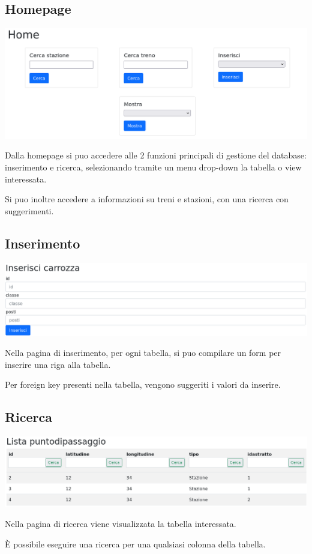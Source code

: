 \documentclass[a4paper,12pt]{report}
\begin{document}
	\subsection{Homepage}
	\includegraphics[width=\linewidth]{res/screenshots/home.png}
	\par Dalla homepage si puo accedere alle 2 funzioni principali di gestione del database: inserimento e ricerca,
	selezionando tramite un menu drop-down la tabella o view interessata.
	\par Si puo inoltre accedere a informazioni su treni e stazioni, con una ricerca con suggerimenti.
	\subsection{Inserimento}
	\includegraphics[width=\linewidth]{res/screenshots/inserisci.png}
	\par Nella pagina di inserimento, per ogni tabella, si puo compilare un form per inserire una riga alla tabella.
	\par Per foreign key presenti nella tabella, vengono suggeriti i valori da inserire.
	\subsection{Ricerca}
	\includegraphics[width=\linewidth]{res/screenshots/lista.png}
	\par Nella pagina di ricerca viene visualizzata la tabella interessata.
	\par \`E possibile eseguire una ricerca per una qualsiasi colonna della tabella.
\end{document}
